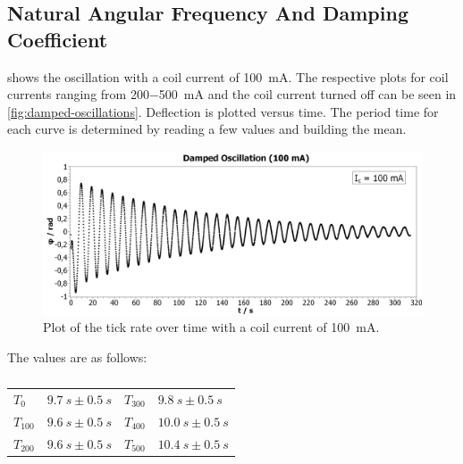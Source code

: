         \subsection{Natural Angular Frequency And Damping Coefficient}
             shows the oscillation with a coil current of \SI{100}{mA}. The respective plots
            for coil currents ranging from \SI{200-500}{mA} and the coil current turned off can be seen in \cref{fig:damped-oscillations}.
            Deflection is plotted versus time. The period time for each curve is determined by reading a few values and building the mean.\par
            \begin{figure}[H]%
                \centering
                \includegraphics[width=1\linewidth]{"messdaten/Damped Oscillation (100mA)"}
                \caption[Course of the tick rate at \(I_{c}=\SI{100}{mA}\)]{Plot of the tick rate over time with a coil current of \SI{100}{mA}.}
                \label{fig:damped-oscillation-100mA}
            \end{figure}
            The values are as follows:\par
            \begin{table}[h]
                \centering
                \caption[Period times for the damped oscillations]{}
                \begin{tabular}{@{}llll@{}}
                    \toprule
                    \( T_0 \)       &$\SI{9.7}{s} \pm \SI{0.5}{s}$    &\hspace{10mm}\(T_{300}\)      &$\SI{9.8}{s} \pm \SI{0.5}{s}$\\
                    \( T_{100} \)   &$\SI{9.6}{s} \pm \SI{0.5}{s}$    &\hspace{10mm}\(T_{400}\)      &$\SI{10.0}{s} \pm \SI{0.5}{s}$\\
                    \(T_{200}\)     &$\SI{9.6}{s} \pm \SI{0.5}{s}$    &\hspace{10mm}\(T_{500}\)      &$\SI{10.4}{s} \pm \SI{0.5}{s}$\\
                    \bottomrule
                \end{tabular}
                \label{tab:period_times_damped_oscillations}
            \end{table}
